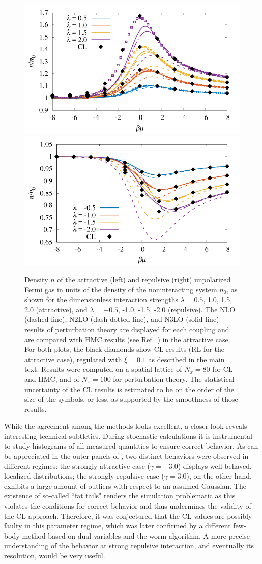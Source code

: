 \documentclass[../main.tex]{subfiles}
\begin{document}
\begin{figure}[t]
  \centering
  \includegraphics[width=0.49\columnwidth]{./5applications-NREL/PerturbationTheoryDensity.pdf}
  \includegraphics[width=0.49\columnwidth]{./5applications-NREL/PerturbationTheoryRepulsiveDensity.pdf}
  \caption{\label{fig:DensityEoSCL1DFiniteT} Density $n$ of the attractive (left) and repulsive (right) unpolarized Fermi gas in units of the density of the
	noninteracting system $n_0$, as shown for the dimensionless interaction strengths $\lambda = 0.5$, 1.0, 1.5, 2.0 (attractive), and $\lambda = -0.5$, -1.0, -1.5, -2.0
	(repulsive). The NLO (dashed line), N2LO (dash-dotted line), and N3LO (solid line) results of perturbation theory are displayed for each coupling and are
	compared with HMC results (see Ref.~\cite{PhysRevA.91.033618}) in the attractive case. For both plots, the black diamonds show CL results
	(RL for the attractive case), regulated with $\xi=0.1$ as described in the main text. Results were computed on a spatial lattice of $N_x = 80$ for CL and HMC, and of $N_x = 100$
  for perturbation theory. The statistical uncertainty of the CL results is estimated to be on
	the order of the size of the symbols, or less, as supported by the smoothness of those results.}
\end{figure}
%

While the agreement among the methods looks excellent, a closer look reveals interesting technical subtleties. During stochastic calculations it is instrumental to study histograms of all measured quantities to ensure correct behavior. As can be appreciated in the outer panels of , two distinct behaviors were observed in different regimes: the strongly attractive case ($\gamma = -3.0$) displays well behaved, localized distributions; the strongly repulsive case ($\gamma=3.0$), on the other hand, exhibits a large amount of outliers with respect to an assumed Gaussian. The existence of so-called ``fat tails" renders the simulation problematic as this violates the conditions for correct behavior and thus undermines the validity of the CL approach. Therefore, it was conjectured that the CL values are possibly faulty in this parameter regime, which was later confirmed by a different few-body method \cite{PhysRevD.99.074511} based on dual variables and the worm algorithm. A more precise understanding of the behavior at strong repulsive interaction, and eventually its resolution, would be very useful.
\end{document}
